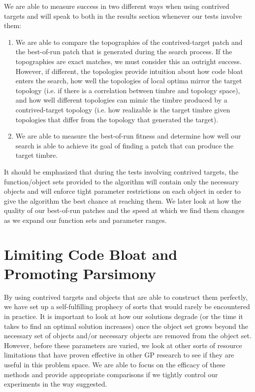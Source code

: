 \documentclass[a4paper,12pt]{report} 	%
\numberwithin{figure}{chapter}
\numberwithin{table}{chapter}
\numberwithin{equation}{chapter}
\begin{document}
\begin{flushleft}
We are able to measure success in two different ways when using contrived targets and will speak to both in the results section whenever our tests involve them:
\begin{enumerate}
\item We are able to compare the topographies of the contrived-target patch and the best-of-run patch that is generated during the search process. If the topographies are exact matches, we must consider this an outright success. However, if different, the topologies provide intuition about how code bloat enters the search, how well the topologies of local optima mirror the target topology (i.e. if there is a correlation between timbre and topology space), and how well different topologies can mimic the timbre produced by a contrived-target topology (i.e. how realizable is the target timbre given topologies that differ from the topology that generated the target).
\item We are able to measure the best-of-run fitness and determine how well our search is able to achieve its goal of finding a patch that can produce the target timbre.
\end{enumerate}

It should be emphasized that during the tests involving contrived targets, the function/object sets provided to the algorithm will contain only the necessary objects and will enforce tight parameter restrictions on each object in order to give the algorithm the best chance at reaching them. We later look at how the quality of our best-of-run patches and the speed at which we find them changes as we expand our function sets and parameter ranges.
\clearpage
\section{Limiting Code Bloat and Promoting Parsimony}

By using contrived targets and objects that are able to construct them perfectly, we have set up a self-fulfilling prophecy of sorts that would rarely be encountered in practice. It is important to look at how our solutions degrade (or the time it takes to find an optimal solution increases) once the object set grows beyond the necessary set of objects and/or necessary objects are removed from the object set. However, before these parameters are varied, we look at other sorts of resource limitations that have proven effective in other GP research to see if they are useful in this problem space. We are able to focus on the efficacy of these methods and provide appropriate comparisons if we tightly control our experiments in the way suggested.


\end{flushleft}
\end{document}
